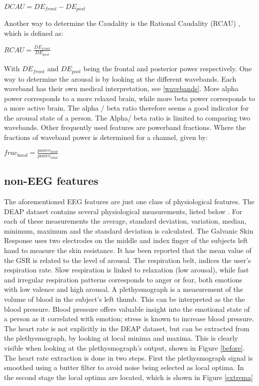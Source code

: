 \begin{center}
$DCAU = DE_{front} - DE_{post}$
\end{center}
Another way to determine the Caudality is the Rational Caudality (RCAU) , which is defined as:
\begin{center}
$RCAU = \frac{DE_{front}}{DE_{post}}$
\end{center}
With $DE_{front}$ and $DE_{post}$ being the frontal and posterior power respectively.
\npar
One way to determine the arousal is by looking at the different wavebands. Each waveband has their own medical interpretation, see \ref{wavebands}. More alpha power corresponds to a more relaxed brain, while more beta power corresponds to a more active brain. The alpha / beta ratio therefore seems a good indicator for the arousal state of a person.
\npar
The Alpha/ beta ratio is limited to comparing two wavebands. Other frequently used features are powerband fractions. Where the fractions of waveband power is determined for a channel, given by:
\begin{center}
$frac_{band} = \frac{power_{band}}{power_{total}}$
\end{center}


\subsection{non-EEG features}
The aforementioned EEG features are just one class of physiological features. The DEAP dataset contains several physiological measurements, listed below \citep{DEAP}. For each of these measurements the average, standard deviation, variation, median, minimum, maximum and the standard deviation is calculated.
\npar
The Galvanic Skin Response  uses two electrodes on the middle and index finger of the subjects left hand to measure the skin resistance. It has been reported that the mean value of the GSR is related to the level of arousal\citep{GSR, DEAP}.
\npar
The respiration belt, indices the user's respiration rate. Slow respiration is linked to relaxation (low arousal), while fast and irregular respiration patterns corresponds to anger or fear, both emotions with low valence and high arousal\citep{DEAP}.
\npar
A plethysmograph is a measurement of the volume of blood in the subject's left thumb. This can be interpreted as the the blood pressure. Blood pressure offers valuable insight into the emotional state of a person as it correlated with emotion; stress is known to increase blood pressure\citep{DEAP}.
\npar
The heart rate is not explicitly in the DEAP dataset, but can be extracted from the plethysmograph, by looking at local minima and maxima\citep{DEAP}. This is clearly visible when looking at the plethysmograph's output, shown in Figure \ref{before}.
\npar
The heart rate extraction is done in two steps. First the plethysmograph signal is smoothed using a butter filter to avoid noise being selected as local optima. In the second stage the local optima are located, which is shown in Figure \ref{extrema}

